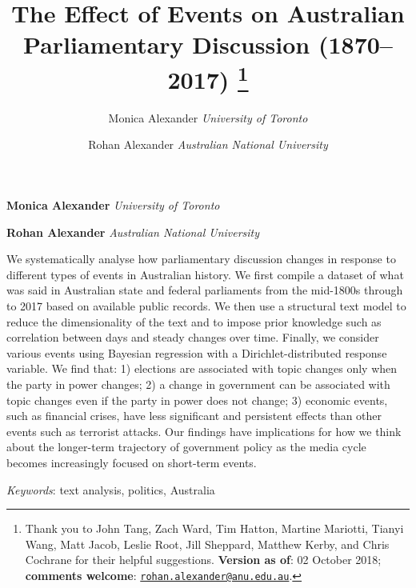 \documentclass[12pt,]{article}
\title{The Effect of Events on Australian Parliamentary Discussion (1870--2017) \thanks{Thank you to John Tang, Zach Ward, Tim Hatton, Martine Mariotti, Tianyi
Wang, Matt Jacob, Leslie Root, Jill Sheppard, Matthew Kerby, and Chris
Cochrane for their helpful suggestions. \textbf{Version as of}: 02
October 2018; \textbf{comments welcome}:
\href{mailto:rohan.alexander@anu.edu.au}{\nolinkurl{rohan.alexander@anu.edu.au}}.}  }
\author{\Large Monica Alexander\vspace{0.05in} \newline\normalsize\emph{University of Toronto}   \and \Large Rohan Alexander\vspace{0.05in} \newline\normalsize\emph{Australian National University}  }
\date{}
\newcommand*{\authorfont}{\fontfamily{phv}\selectfont}
\renewenvironment{abstract}
 {{%
    \setlength{\leftmargin}{0mm}
    \setlength{\rightmargin}{\leftmargin}%
  }%
  \relax}
 {\endlist}
\theoremstyle{definition}
\theoremstyle{definition}
\theoremstyle{definition}
\theoremstyle{remark}
\begin{document}
	
%

{%
\setlength{\parindent}{0pt}
\thispagestyle{plain}
{\fontsize{18}{20}\selectfont\raggedright 
\maketitle  %

}

{
   \vskip 13.5pt\relax \normalsize\fontsize{11}{12} 
\textbf{\authorfont Monica Alexander} \hskip 15pt \emph{\small University of Toronto}   \par \textbf{\authorfont Rohan Alexander} \hskip 15pt \emph{\small Australian National University}   

}

}








\begin{abstract}

    \hbox{\vrule height .2pt width 39.14pc}

    \vskip 8.5pt %

\noindent We systematically analyse how parliamentary discussion changes in
response to different types of events in Australian history. We first
compile a dataset of what was said in Australian state and federal
parliaments from the mid-1800s through to 2017 based on available public
records. We then use a structural text model to reduce the
dimensionality of the text and to impose prior knowledge such as
correlation between days and steady changes over time. Finally, we
consider various events using Bayesian regression with a
Dirichlet-distributed response variable. We find that: 1) elections are
associated with topic changes only when the party in power changes; 2) a
change in government can be associated with topic changes even if the
party in power does not change; 3) economic events, such as financial
crises, have less significant and persistent effects than other events
such as terrorist attacks. Our findings have implications for how we
think about the longer-term trajectory of government policy as the media
cycle becomes increasingly focused on short-term events.


\vskip 8.5pt \noindent \emph{Keywords}: text analysis, politics, Australia \par

    \hbox{\vrule height .2pt width 39.14pc}



\end{abstract}
\end{document}

